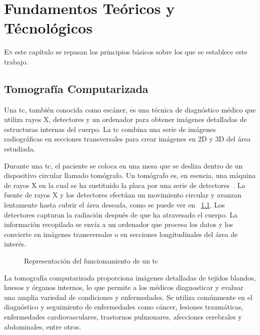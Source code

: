 \chapter{Fundamentos Teóricos y Técnológicos}
\label{chap:ft}
\lettrine{E}{n} este capítulo se repasan los principios básicos sobre los que se establece este trabajo.
\section{Tomografía Computarizada}

Una \acrfull{tc}, también conocida como escáner, es una técnica de
diagnóstico médico que utiliza rayos X, detectores y un ordenador para
obtener imágenes detalladas de estructuras internas del cuerpo. La
\acrshort{tc} combina una serie de imágenes radiográficas en secciones
transversales para crear imágenes en 2D y 3D del área estudiada.

Durante una \acrshort{tc}, el paciente se coloca en una mesa que se
desliza dentro de un dispositivo circular llamado tomógrafo. Un
tomógrafo es, en esencia, una máquina de rayos X en la cual se ha
sustituido la placa por una serie de
detectores~\cite{muniz2006introduccion}. La fuente de rayos X y los
detectores efectúan un movimiento circular y avanzan lentamente hasta
cubrir el área deseada, como se puede ver en
\figurename~\ref{fig:tac}. Los detectores capturan la radiación
después de que ha atravesado el cuerpo. La información recopilada se
envía a un ordenador que procesa los datos y los convierte en imágenes
transversales o en secciones longitudinales del área de interés.

\begin{figure}%
	\centering
	\qquad
	\caption{Representación del funcionamiento de un \acrshort{tc}}%
	\label{fig:tac}%
\end{figure}

La tomografía computarizada proporciona imágenes detalladas de tejidos
blandos, huesos y órganos internos, lo que permite a los médicos
diagnosticar y evaluar una amplia variedad de condiciones y
enfermedades. Se utiliza comúnmente en el diagnóstico y seguimiento de
enfermedades como cáncer, lesiones traumáticas, enfermedades
cardiovasculares, trastornos pulmonares, afecciones cerebrales y
abdominales, entre otros.



